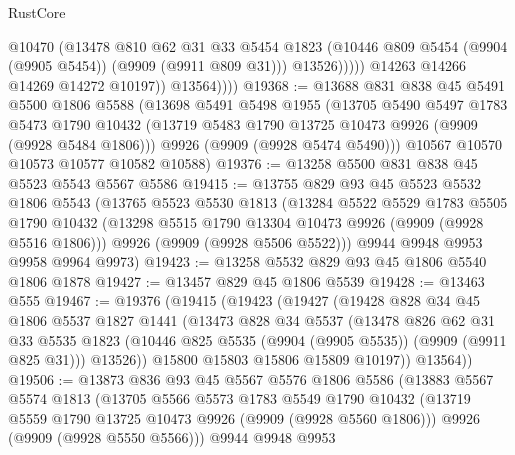 \begin{lexlean}{RustCore}
\begin{coremodule}
                        @10470
                        (@13478
                          @810
                          @62
                          @31
                          @33
                          @5454
                          @1823
                          (@10446 @809 @5454 (@9904 (@9905 @5454)) (@9909 (@9911 @809 @31)))
                          @13526)))))
                @14263
                @14266
                @14269
                @14272
                @10197))
            @13564))))
@19368 := @13688
    @831
    @838
    @45
    @5491
    @5500
    @1806
    @5588
    (@13698
      @5491
      @5498
      @1955
      (@13705
        @5490
        @5497
        @1783
        @5473
        @1790
        @10432
        (@13719 @5483 @1790 @13725 @10473 @9926 (@9909 (@9928 @5484 @1806)))
        @9926
        (@9909 (@9928 @5474 @5490)))
      @10567
      @10570
      @10573
      @10577
      @10582
      @10588)
@19376 := @13258 @5500 @831 @838 @45 @5523 @5543 @5567 @5586
@19415 := @13755
    @829
    @93
    @45
    @5523
    @5532
    @1806
    @5543
    (@13765
      @5523
      @5530
      @1813
      (@13284
        @5522
        @5529
        @1783
        @5505
        @1790
        @10432
        (@13298 @5515 @1790 @13304 @10473 @9926 (@9909 (@9928 @5516 @1806)))
        @9926
        (@9909 (@9928 @5506 @5522)))
      @9944
      @9948
      @9953
      @9958
      @9964
      @9973)
@19423 := @13258 @5532 @829 @93 @45 @1806 @5540 @1806 @1878
@19427 := @13457 @829 @45 @1806 @5539
@19428 := @13463 @555
@19467 := @19376
    (@19415
      (@19423
        (@19427
          (@19428
            @828
            @34
            @45
            @1806
            @5537
            @1827
            @1441
            (@13473
              @828
              @34
              @5537
              (@13478
                @826
                @62
                @31
                @33
                @5535
                @1823
                (@10446 @825 @5535 (@9904 (@9905 @5535)) (@9909 (@9911 @825 @31)))
                @13526))
            @15800
            @15803
            @15806
            @15809
            @10197))
        @13564))
@19506 := @13873
    @836
    @93
    @45
    @5567
    @5576
    @1806
    @5586
    (@13883
      @5567
      @5574
      @1813
      (@13705
        @5566
        @5573
        @1783
        @5549
        @1790
        @10432
        (@13719 @5559 @1790 @13725 @10473 @9926 (@9909 (@9928 @5560 @1806)))
        @9926
        (@9909 (@9928 @5550 @5566)))
      @9944
      @9948
      @9953

\end{coremodule}
\end{lexlean}

